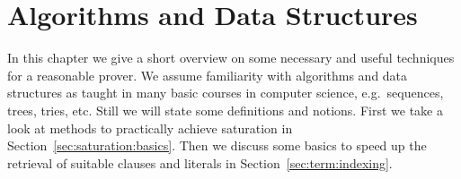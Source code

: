 
\chapter{Algorithms and Data Structures}

In this chapter we give a short overview on some necessary and useful techniques for a reasonable prover. We assume familiarity with algorithms and data structures as taught in many basic courses in computer science, e.g.\ sequences, trees, tries, etc. Still we will state some definitions and notions.
First we take a look at methods to practically achieve saturation in Section~\vref{sec:saturation:basics}.
Then we discuss some basics to speed up the retrieval of
suitable clauses and literals in Section~\vref{sec:term:indexing}.











